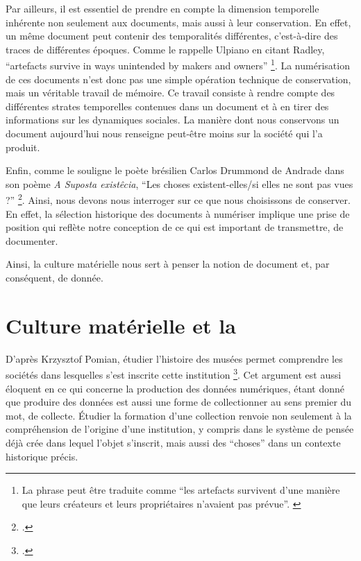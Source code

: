         Par ailleurs, il est essentiel de prendre en compte la dimension temporelle inhérente non seulement aux documents, mais aussi à leur conservation. En effet, un même document peut contenir des temporalités différentes, c'est-à-dire des traces de différentes époques. Comme le rappelle Ulpiano en citant Radley, \enquote{artefacts survive in ways unintended by makers and owners} \footnote{La phrase peut être traduite comme \enquote{les artefacts survivent d'une manière que leurs créateurs et leurs propriétaires n'avaient pas prévue}. \cite[p.~90.]{meneses1998}}. La numérisation de ces documents n'est donc pas une simple opération technique de conservation, mais un véritable travail de mémoire. Ce travail consiste à rendre compte des différentes strates temporelles contenues dans un document et à en tirer des informations sur les dynamiques sociales. La manière dont nous conservons un document aujourd'hui nous renseigne peut-être moins sur la société qui l'a produit.
    
        Enfin, comme le souligne le poète brésilien Carlos Drummond de Andrade dans son poème \textit{A Suposta existêcia}, \enquote{Les choses existent-elles/si elles ne sont pas vues ?} \footnote{\cite[p.~1]{meneses1980}.}. Ainsi, nous devons nous interroger sur ce que nous choisissons de conserver. En effet, la sélection historique des documents à numériser implique une prise de position qui reflète notre conception de ce qui est important de transmettre, de documenter.

        Ainsi, la culture matérielle nous sert à penser la notion de document et, par conséquent, de donnée. 
        
        \section{Culture matérielle et la \psdn}
        D’après Krzysztof Pomian, étudier l’histoire des musées permet comprendre les sociétés dans lesquelles s’est inscrite cette institution \footnote{\cite[p.~18]{pomian2020}.}. Cet argument est aussi éloquent en ce qui concerne la production des données numériques, étant donné que produire des données est aussi une forme de collectionner au sens premier du mot, de collecte. Étudier la formation d'une collection renvoie non seulement à la compréhension de l’origine d'une institution, y compris dans le système de pensée déjà crée dans lequel l’objet s’inscrit, mais aussi des \enquote{choses} dans un contexte historique précis.

